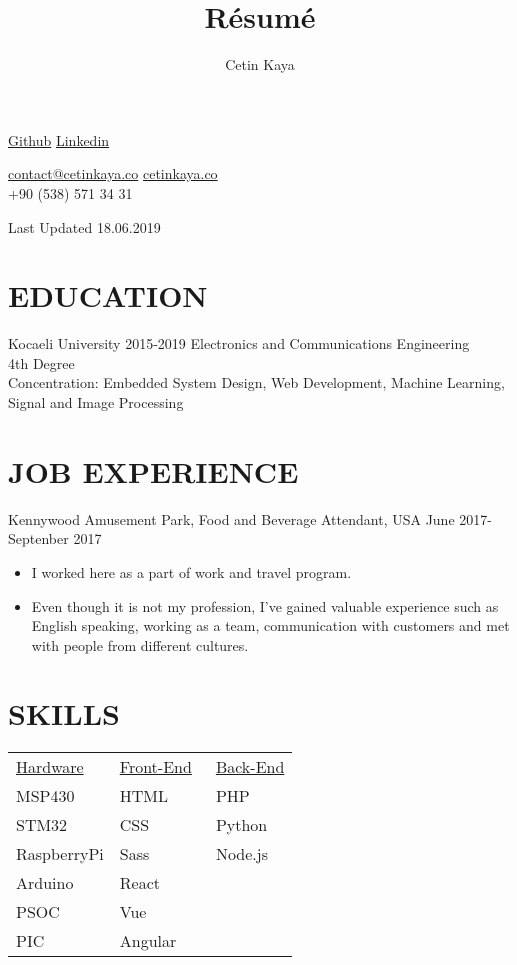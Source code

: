 \documentclass[8pt]{article}
\makeatletter
\renewcommand{\maketitle}{
\begin{center}
{\huge
\thetitle{
}
\vspace{0.5em}

}
{
\huge \bfseries
\theauthor}
\vspace{0.5em}

\faGithub\hspace{0.5em}\textcolor{Mycolor1}{\href{https://github.com/Zrrck?tab=repositories}{Github}}\hspace{0.5em}
\faLinkedin\hspace{0.5em}\textcolor{Mycolor1}{\href{https://www.linkedin.com/in/cetin-kaya/}{Linkedin}}\\\vspace{0.5em}

\faEnvelope \hspace{0.2em}\href{mailto:contact@cetinkaya.co}{contact@cetinkaya.co}\hspace{0.2em}
\faWordpress \hspace{0.2em}\textcolor{Mycolor1}{\href{http://cetinkaya.co}{cetinkaya.co}}\hspace{0.2em}\\
\vspace{0.5em}
\faPhoneSquare+90 (538) 571 34 31\vspace{1.em}



Last Updated 18.06.2019

\end{center}
}
\makeatother
\begin{document}
\title{R\'esum\'e}
\author{Cetin Kaya}
\maketitle




\section{EDUCATION}
Kocaeli University \hspace{10.em} 2015-2019
Electronics and Communications Engineering\\ 4th Degree \\
Concentration: Embedded System Design, Web Development, Machine Learning, Signal and Image Processing

\section{JOB EXPERIENCE}
Kennywood Amusement Park, Food and Beverage Attendant, USA \hspace{6.em}June 2017-Septenber 2017

\begin{itemize}
\itemsep0em
\item I worked here as a part of work and travel program. 
\item Even though it is not my profession, I've gained valuable
experience such as English speaking, working as a team,
communication with customers and met with people from different
cultures.
\end{itemize}


\section{SKILLS}
\begin{table}[H]
\centering
\begin{tabular}{p{10em} p{10em}p{10em}} 

 \underline{Hardware} ~ & \underline{Front-End}~ & \underline{Back-End }     \\              
 
 MSP430 & HTML & PHP \\ 
 STM32 &  CSS& Python \\ 
 RaspberryPi & Sass & Node.js  \\ 
 Arduino & React &  \\ 
  PSOC & Vue &  \\ 
   PIC & Angular &  \\ 



\end{tabular}
\end{table}
\end{document}

